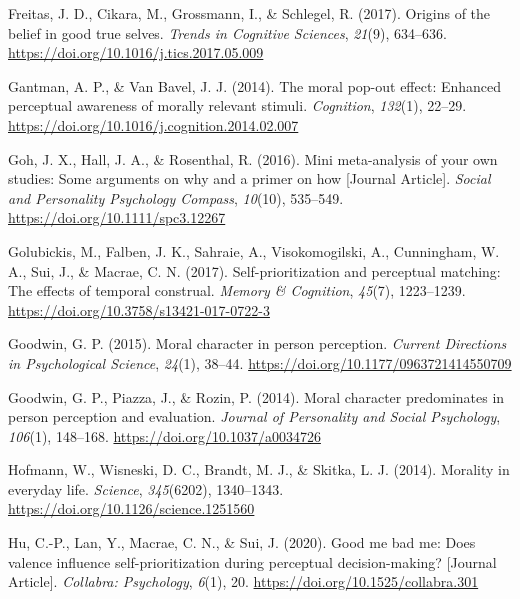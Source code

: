 \documentclass[
  man]{apa6}
\newlength{\cslhangindent}
\newlength{\cslentryspacingunit} %
\newenvironment{CSLReferences}[2] %
 {%
  \setlength{\parindent}{0pt}
  \ifodd #1
  \let\oldpar\par
  \def\par{\hangindent=\cslhangindent\oldpar}
  \fi
  \setlength{\parskip}{#2\cslentryspacingunit}
 }%
 {}
\begin{document}
\begin{CSLReferences}{1}{0}
\leavevmode{}%
Freitas, J. D., Cikara, M., Grossmann, I., \& Schlegel, R. (2017). Origins of the belief in good true selves. \emph{Trends in Cognitive Sciences}, \emph{21}(9), 634--636. \url{https://doi.org/10.1016/j.tics.2017.05.009}

\leavevmode{}%
Gantman, A. P., \& Van Bavel, J. J. (2014). The moral pop-out effect: Enhanced perceptual awareness of morally relevant stimuli. \emph{Cognition}, \emph{132}(1), 22--29. \url{https://doi.org/10.1016/j.cognition.2014.02.007}

\leavevmode{}%
Goh, J. X., Hall, J. A., \& Rosenthal, R. (2016). Mini meta-analysis of your own studies: Some arguments on why and a primer on how {[}Journal Article{]}. \emph{Social and Personality Psychology Compass}, \emph{10}(10), 535--549. \url{https://doi.org/10.1111/spc3.12267}

\leavevmode{}%
Golubickis, M., Falben, J. K., Sahraie, A., Visokomogilski, A., Cunningham, W. A., Sui, J., \& Macrae, C. N. (2017). Self-prioritization and perceptual matching: The effects of temporal construal. \emph{Memory \& Cognition}, \emph{45}(7), 1223--1239. \url{https://doi.org/10.3758/s13421-017-0722-3}

\leavevmode{}%
Goodwin, G. P. (2015). Moral character in person perception. \emph{Current Directions in Psychological Science}, \emph{24}(1), 38--44. \url{https://doi.org/10.1177/0963721414550709}

\leavevmode{}%
Goodwin, G. P., Piazza, J., \& Rozin, P. (2014). Moral character predominates in person perception and evaluation. \emph{Journal of Personality and Social Psychology}, \emph{106}(1), 148--168. \url{https://doi.org/10.1037/a0034726}

\leavevmode{}%
Hofmann, W., Wisneski, D. C., Brandt, M. J., \& Skitka, L. J. (2014). Morality in everyday life. \emph{Science}, \emph{345}(6202), 1340--1343. \url{https://doi.org/10.1126/science.1251560}

\leavevmode{}%
Hu, C.-P., Lan, Y., Macrae, C. N., \& Sui, J. (2020). Good me bad me: Does valence influence self-prioritization during perceptual decision-making? {[}Journal Article{]}. \emph{Collabra: Psychology}, \emph{6}(1), 20. \url{https://doi.org/10.1525/collabra.301}


\end{CSLReferences}
\end{document}
